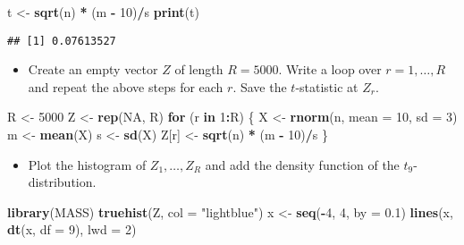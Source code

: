 \documentclass[]{article}
\newenvironment{Shaded}{\begin{snugshade}}{\end{snugshade}}
\newcommand{\KeywordTok}[1]{\textcolor[rgb]{0.13,0.29,0.53}{\textbf{#1}}}
\newcommand{\DataTypeTok}[1]{\textcolor[rgb]{0.13,0.29,0.53}{#1}}
\newcommand{\DecValTok}[1]{\textcolor[rgb]{0.00,0.00,0.81}{#1}}
\newcommand{\FloatTok}[1]{\textcolor[rgb]{0.00,0.00,0.81}{#1}}
\newcommand{\StringTok}[1]{\textcolor[rgb]{0.31,0.60,0.02}{#1}}
\newcommand{\OtherTok}[1]{\textcolor[rgb]{0.56,0.35,0.01}{#1}}
\newcommand{\ControlFlowTok}[1]{\textcolor[rgb]{0.13,0.29,0.53}{\textbf{#1}}}
\newcommand{\OperatorTok}[1]{\textcolor[rgb]{0.81,0.36,0.00}{\textbf{#1}}}
\newcommand{\NormalTok}[1]{#1}
\providecommand{\tightlist}{%
  \setlength{\itemsep}{0pt}\setlength{\parskip}{0pt}}
\begin{document}
\begin{Shaded}
\begin{Highlighting}[]
\NormalTok{t <-}\StringTok{ }\KeywordTok{sqrt}\NormalTok{(n) }\OperatorTok{*}\StringTok{ }\NormalTok{(m }\OperatorTok{-}\StringTok{ }\DecValTok{10}\NormalTok{)}\OperatorTok{/}\NormalTok{s}
\KeywordTok{print}\NormalTok{(t)}
\end{Highlighting}
\end{Shaded}

\begin{verbatim}
## [1] 0.07613527
\end{verbatim}

\begin{itemize}
\tightlist
\item
  Create an empty vector \(Z\) of length \(R=5000\). Write a loop over
  \(r=1,\ldots ,R\) and repeat the above steps for each \(r\). Save the
  \(t\)-statistic at \(Z_{r}\).
\end{itemize}

\begin{Shaded}
\begin{Highlighting}[]
\NormalTok{R <-}\StringTok{ }\DecValTok{5000}
\NormalTok{Z <-}\StringTok{ }\KeywordTok{rep}\NormalTok{(}\OtherTok{NA}\NormalTok{, R)}
\ControlFlowTok{for}\NormalTok{ (r }\ControlFlowTok{in} \DecValTok{1}\OperatorTok{:}\NormalTok{R) \{}
\NormalTok{    X <-}\StringTok{ }\KeywordTok{rnorm}\NormalTok{(n, }\DataTypeTok{mean =} \DecValTok{10}\NormalTok{, }\DataTypeTok{sd =} \DecValTok{3}\NormalTok{)}
\NormalTok{    m <-}\StringTok{ }\KeywordTok{mean}\NormalTok{(X)}
\NormalTok{    s <-}\StringTok{ }\KeywordTok{sd}\NormalTok{(X)}
\NormalTok{    Z[r] <-}\StringTok{ }\KeywordTok{sqrt}\NormalTok{(n) }\OperatorTok{*}\StringTok{ }\NormalTok{(m }\OperatorTok{-}\StringTok{ }\DecValTok{10}\NormalTok{)}\OperatorTok{/}\NormalTok{s}
\NormalTok{\}}
\end{Highlighting}
\end{Shaded}

\begin{itemize}
\tightlist
\item
  Plot the histogram of \(Z_{1},\ldots ,Z_{R}\) and add the density
  function of the \(t_{9}\)-distribution.
\end{itemize}

\begin{Shaded}
\begin{Highlighting}[]
\KeywordTok{library}\NormalTok{(MASS)}
\KeywordTok{truehist}\NormalTok{(Z, }\DataTypeTok{col =} \StringTok{"lightblue"}\NormalTok{)}
\NormalTok{x <-}\StringTok{ }\KeywordTok{seq}\NormalTok{(}\OperatorTok{-}\DecValTok{4}\NormalTok{, }\DecValTok{4}\NormalTok{, }\DataTypeTok{by =} \FloatTok{0.1}\NormalTok{)}
\KeywordTok{lines}\NormalTok{(x, }\KeywordTok{dt}\NormalTok{(x, }\DataTypeTok{df =} \DecValTok{9}\NormalTok{), }\DataTypeTok{lwd =} \DecValTok{2}\NormalTok{)}
\end{Highlighting}
\end{Shaded}
\end{document}
